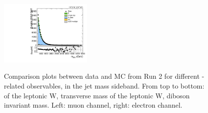 \begin{figure}[htbp]
  \includegraphics[width=0.4\textwidth]{fig/controlPlots/SB_b1_e_allP_allC_allE_Run2_mWV.pdf}\\
  \caption{
    Comparison plots between data and MC from Run 2 for different \Wlep-related observables, in the jet mass sideband.
    From top to bottom: \pt of the leptonic W, transverse mass of the leptonic W, diboson invariant mass.
    Left: muon channel, right: electron channel.
  }
  \label{fig:SB_controlPlotsRun2_2}
\end{figure}

